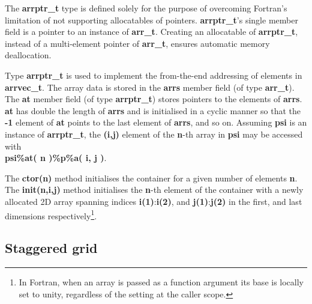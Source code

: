 \documentclass[final,5p,times,twocolumn]{elsarticle}
\newcommand{\prog}[1]{{\rm\bf#1}}
\begin{document}
  The \prog{arrptr\_t} type is defined solely for the purpose of overcoming Fortran's limitation
    of not supporting allocatables of pointers.
  \prog{arrptr\_t}'s single member field is a pointer to an instance of \prog{arr\_t}.
  Creating an allocatable of \prog{arrptr\_t}, instead of 
    a multi-element pointer of \prog{arr\_t}, ensures automatic memory deallocation.

  Type \prog{arrptr\_t} is used to implement the from-the-end addressing of elements in \prog{arrvec\_t}.
  The array data is stored in the \prog{arrs} member field (of type \prog{arr\_t}).
  The \prog{at} member field (of type \prog{arrptr\_t}) stores pointers to the elements of \prog{arrs}. 
  \prog{at} has double the length of \prog{arrs} and is initialised in a cyclic manner so that
    the \prog{-1} element of \prog{at} points to the last element of \prog{arrs}, and so on.
  Assuming \prog{psi} is an instance of \prog{arrptr\_t}, the \prog{(i,j)} element of the \prog{n}-th array in \prog{psi}
    may be accessed with\\ \prog{psi\%at( n )\%p\%a( i, j )}.

  The \prog{ctor(n)} method initialises the container for a given number of elements \prog{n}.
  The \prog{init(n,i,j)} method initialises the \prog{n}-th element of the container with 
    a newly allocated 2D array spanning indices \prog{i(1)}:\prog{i(2)}, 
    and \prog{j(1)}:\prog{j(2)} in the first, and last dimensions respectively\footnote{In Fortran, when an array
    is passed as a function argument its base is locally set to unity, regardless of the setting
    at the caller scope.}.

  \subsection{Staggered grid}\label{sec:grid}
\end{document}

